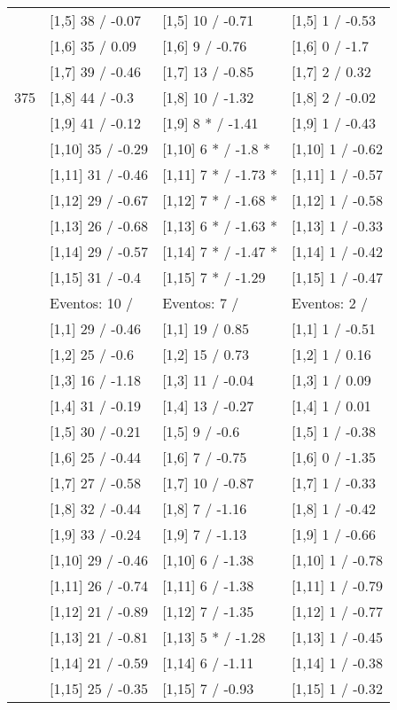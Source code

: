 \begin{table}
\begin{tabular}[t]{llll}
 & {}[1,5] 38  / -0.07 & {}[1,5] 10  / -0.71 & {}[1,5] 1  / -0.53\\
 & {}[1,6] 35  / 0.09 & {}[1,6] 9  / -0.76 & {}[1,6] 0  / -1.7\\
 & {}[1,7] 39  / -0.46 & {}[1,7] 13  / -0.85 & {}[1,7] 2  / 0.32\\
375 & {}[1,8] 44  / -0.3 & {}[1,8] 10  / -1.32 & {}[1,8] 2  / -0.02\\
\addlinespace
 & {}[1,9] 41  / -0.12 & {}[1,9] 8 * / -1.41 & {}[1,9] 1  / -0.43\\
 & {}[1,10] 35  / -0.29 & {}[1,10] 6 * / -1.8 * & {}[1,10] 1  / -0.62\\
 & {}[1,11] 31  / -0.46 & {}[1,11] 7 * / -1.73 * & {}[1,11] 1  / -0.57\\
 & {}[1,12] 29  / -0.67 & {}[1,12] 7 * / -1.68 * & {}[1,12] 1  / -0.58\\
 & {}[1,13] 26  / -0.68 & {}[1,13] 6 * / -1.63 * & {}[1,13] 1  / -0.33\\
\addlinespace
 & {}[1,14] 29  / -0.57 & {}[1,14] 7 * / -1.47 * & {}[1,14] 1  / -0.42\\
 & {}[1,15] 31  / -0.4 & {}[1,15] 7 * / -1.29 & {}[1,15] 1  / -0.47\\
 & Eventos:  10 / & Eventos:  7 / & Eventos:  2 /\\
 & {}[1,1] 29  / -0.46 & {}[1,1] 19  / 0.85 & {}[1,1] 1  / -0.51\\
 & {}[1,2] 25  / -0.6 & {}[1,2] 15  / 0.73 & {}[1,2] 1  / 0.16\\
\addlinespace
 & {}[1,3] 16  / -1.18 & {}[1,3] 11  / -0.04 & {}[1,3] 1  / 0.09\\
 & {}[1,4] 31  / -0.19 & {}[1,4] 13  / -0.27 & {}[1,4] 1  / 0.01\\
 & {}[1,5] 30  / -0.21 & {}[1,5] 9  / -0.6 & {}[1,5] 1  / -0.38\\
 & {}[1,6] 25  / -0.44 & {}[1,6] 7  / -0.75 & {}[1,6] 0  / -1.35\\
 & {}[1,7] 27  / -0.58 & {}[1,7] 10  / -0.87 & {}[1,7] 1  / -0.33\\
\addlinespace
500 & {}[1,8] 32  / -0.44 & {}[1,8] 7  / -1.16 & {}[1,8] 1  / -0.42\\
 & {}[1,9] 33  / -0.24 & {}[1,9] 7  / -1.13 & {}[1,9] 1  / -0.66\\
 & {}[1,10] 29  / -0.46 & {}[1,10] 6  / -1.38 & {}[1,10] 1  / -0.78\\
 & {}[1,11] 26  / -0.74 & {}[1,11] 6  / -1.38 & {}[1,11] 1  / -0.79\\
 & {}[1,12] 21  / -0.89 & {}[1,12] 7  / -1.35 & {}[1,12] 1  / -0.77\\
\addlinespace
 & {}[1,13] 21  / -0.81 & {}[1,13] 5 * / -1.28 & {}[1,13] 1  / -0.45\\
 & {}[1,14] 21  / -0.59 & {}[1,14] 6  / -1.11 & {}[1,14] 1  / -0.38\\
 & {}[1,15] 25  / -0.35 & {}[1,15] 7  / -0.93 & {}[1,15] 1  / -0.32\\
\bottomrule
\end{tabular}
\end{table}
